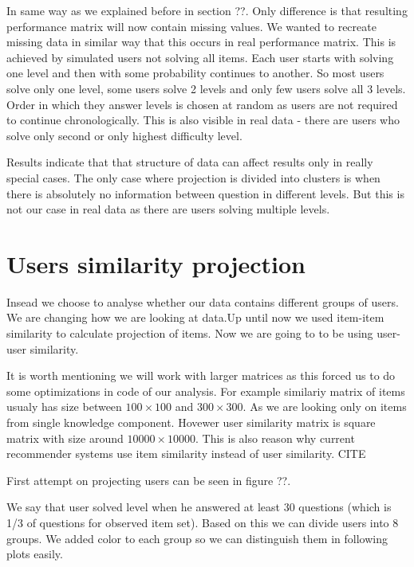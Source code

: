 \documentclass[
  digital, %
  table,   %
  nolof,     %
  nolot,     %
  nocover
]{fithesis3}
\begin{document}
In same way as we explained before in section ??. Only difference is that resulting performance matrix will now contain missing values. We wanted to recreate missing data in similar way that this occurs in real performance matrix. This is achieved by simulated users not solving all items. Each user starts with solving one level and then with some probability continues to another. So most users solve only one level, some users solve 2 levels and only few users solve all 3 levels. Order in which they answer levels is chosen at random as users are not required to continue chronologically. This is also visible in real data - there are users who solve only second or only highest difficulty level.

Results indicate that that structure of data can affect results only in really special cases. The only case where projection is divided into clusters is when there is absolutely no information between question in different levels. But this is not our case in real data as there are users solving multiple levels.


\section{Users similarity
projection}\label{users-similarity-projection}

Insead we choose to analyse whether our data contains different groups
of users. We are changing how we are looking at data.Up until now we
used item-item similarity to calculate projection of items. Now we are
going to to be using user-user similarity.

It is worth mentioning we will work with larger matrices as this forced
us to do some optimizations in code of our analysis. For example
similariy matrix of items usualy has size between $100\times 100$ and
$300\times 300$. As we are looking only on items from single knowledge
component. Hovewer user similarity matrix is square matrix with size
around $10 000\times 10 000$. This is also reason why current
recommender systems use item similarity instead of user similarity. CITE

First attempt on projecting users can be seen in figure ??.


We say that user solved level when he answered at least 30 questions
(which is 1/3 of questions for observed item set). Based on this we can
divide users into 8 groups. We added color to each group so we can
distinguish them in following plots easily.
\end{document}
